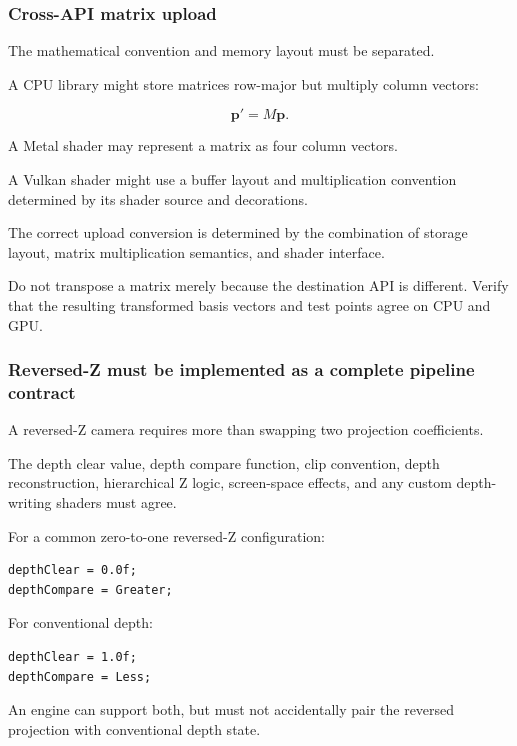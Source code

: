 \subsubsection{Cross-API matrix upload}\label{cross-api-matrix-upload}

The mathematical convention and memory layout must be separated.

A CPU library might store matrices row-major but multiply column vectors:

\[ \mathbf p'=M\mathbf p. \]

A Metal shader may represent a matrix as four column vectors.

A Vulkan shader might use a buffer layout and multiplication convention determined by its shader source and decorations.

The correct upload conversion is determined by the combination of storage layout, matrix multiplication semantics, and shader interface.

Do not transpose a matrix merely because the destination API is different. Verify that the resulting transformed basis vectors and test points agree on CPU and GPU.

\subsubsection{Reversed-Z must be implemented as a complete pipeline contract}\label{reversed-z-must-be-implemented-as-a-complete-pipeline-contract}

A reversed-Z camera requires more than swapping two projection coefficients.

The depth clear value, depth compare function, clip convention, depth reconstruction, hierarchical Z logic, screen-space effects, and any custom depth-writing shaders must agree.

For a common zero-to-one reversed-Z configuration:

\begin{verbatim}
depthClear = 0.0f;
depthCompare = Greater;
\end{verbatim}

For conventional depth:

\begin{verbatim}
depthClear = 1.0f;
depthCompare = Less;
\end{verbatim}

An engine can support both, but must not accidentally pair the reversed projection with conventional depth state.

